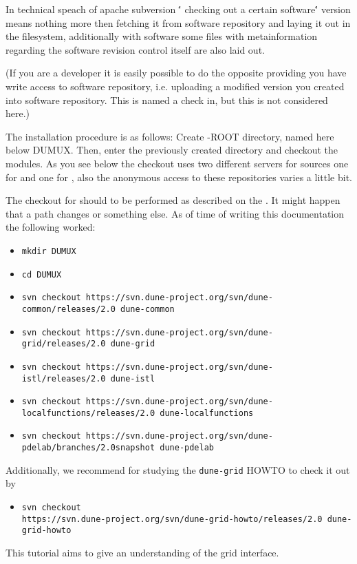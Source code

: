 In technical speach of apache subversion \'' checking out a certain software\'' version means nothing more then fetching 
it from software repository and laying it out in the filesystem, additionally with software some files with metainformation regarding the software revision control itself are also laid out.

(If you are a developer it is easily possible to do the opposite providing you have write access to software repository, i.e. uploading a modified version you created into software repository. This is named a check in, but this is not considered here.)

The installation procedure is as follows:
Create {\Dune}-ROOT directory, named here below DUMUX.
Then, enter the previously created directory and checkout the modules. 
As you see below the checkout uses two different servers for sources one for \Dune and one for \Dumux, also the 
anonymous access to these repositories varies a little bit. 

The checkout for \Dune should to be performed as described on the \Dune \cite{DUNE-HP}.
It might happen that a path changes or something else.  As of time of writing this documentation the following worked: 
\begin{itemize}
\item \texttt{mkdir DUMUX}
\item \texttt{cd DUMUX}
\item \texttt{svn checkout https://svn.dune-project.org/svn/dune-common/releases/2.0 dune-common}
\item \texttt{svn checkout https://svn.dune-project.org/svn/dune-grid/releases/2.0 dune-grid}
\item \texttt{svn checkout https://svn.dune-project.org/svn/dune-istl/releases/2.0 dune-istl}
\item \texttt{svn checkout https://svn.dune-project.org/svn/dune-localfunctions/releases/2.0 dune-localfunctions}
\item \texttt{svn checkout https://svn.dune-project.org/svn/dune-pdelab/branches/2.0snapshot dune-pdelab}
\end{itemize} 

Additionally, we recommend for studying the \texttt{dune-grid} HOWTO to check it out by 
\begin{itemize}
\item \texttt{svn checkout \\
      \hspace{4cm} https://svn.dune-project.org/svn/dune-grid-howto/releases/2.0 dune-grid-howto}
\end{itemize}
This tutorial aims to give an understanding of the \Dune grid interface. 

